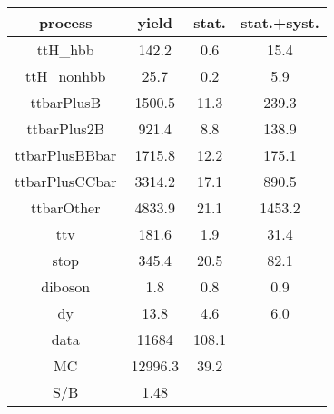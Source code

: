 \begin{tabular}{cccc}
\hline
    process     &  yield  &  stat.  &  stat.+syst.  \\
\hline
    ttH\_hbb     &  142.2  &   0.6   &     15.4      \\
   ttH\_nonhbb   &  25.7   &   0.2   &      5.9      \\
   ttbarPlusB   & 1500.5  &  11.3   &     239.3     \\
  ttbarPlus2B   &  921.4  &   8.8   &     138.9     \\
 ttbarPlusBBbar & 1715.8  &  12.2   &     175.1     \\
 ttbarPlusCCbar & 3314.2  &  17.1   &     890.5     \\
   ttbarOther   & 4833.9  &  21.1   &    1453.2     \\
      ttv       &  181.6  &   1.9   &     31.4      \\
      stop      &  345.4  &  20.5   &     82.1      \\
    diboson     &   1.8   &   0.8   &      0.9      \\
       dy       &  13.8   &   4.6   &      6.0      \\
\hline
      data      &  11684  &  108.1  &               \\
       MC       & 12996.3 &  39.2   &               \\
\hline
      S/B       &  1.48   &         &               \\
\hline
\end{tabular}
